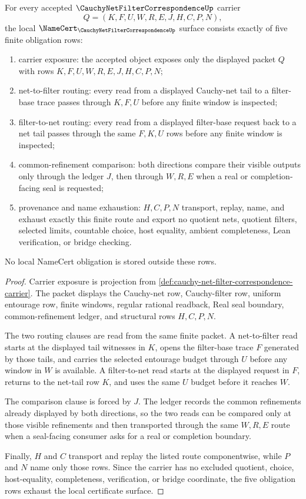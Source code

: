 \begin{theorem}
\label{thm:cauchy-net-filter-correspondence-namecert-obligations}
For every accepted $\CauchyNetFilterCorrespondenceUp$ carrier
$$
Q=(K,F,U,W,R,E,J,H,C,P,N),
$$
the local $\NameCert_{\CauchyNetFilterCorrespondenceUp}$ surface consists exactly of five finite obligation rows:
\begin{enumerate}
\item carrier exposure: the accepted object exposes only the displayed packet $Q$ with rows $K,F,U,W,R,E,J,H,C,P,N$;
\item net-to-filter routing: every read from a displayed Cauchy-net tail to a filter-base trace passes through $K,F,U$ before any finite window is inspected;
\item filter-to-net routing: every read from a displayed filter-base request back to a net tail passes through the same $F,K,U$ rows before any finite window is inspected;
\item common-refinement comparison: both directions compare their visible outputs only through the ledger $J$, then through $W,R,E$ when a real or completion-facing seal is requested;
\item provenance and name exhaustion: $H,C,P,N$ transport, replay, name, and exhaust exactly this finite route and export no quotient nets, quotient filters, selected limits, countable choice, host equality, ambient completeness, Lean verification, or bridge checking.
\end{enumerate}
No local NameCert obligation is stored outside these rows.
\end{theorem}
\begin{proof}
Carrier exposure is projection from \autoref{def:cauchy-net-filter-correspondence-carrier}. The packet displays the Cauchy-net row, Cauchy-filter row, uniform entourage row, finite windows, regular rational readback, Real seal boundary, common-refinement ledger, and structural rows $H,C,P,N$.

The two routing clauses are read from the same finite packet. A net-to-filter read starts at the displayed tail witnesses in $K$, opens the filter-base trace $F$ generated by those tails, and carries the selected entourage budget through $U$ before any window in $W$ is available. A filter-to-net read starts at the displayed request in $F$, returns to the net-tail row $K$, and uses the same $U$ budget before it reaches $W$.

The comparison clause is forced by $J$. The ledger records the common refinements already displayed by both directions, so the two reads can be compared only at those visible refinements and then transported through the same $W,R,E$ route when a seal-facing consumer asks for a real or completion boundary.

Finally, $H$ and $C$ transport and replay the listed route componentwise, while $P$ and $N$ name only those rows. Since the carrier has no excluded quotient, choice, host-equality, completeness, verification, or bridge coordinate, the five obligation rows exhaust the local certificate surface.
\end{proof}

